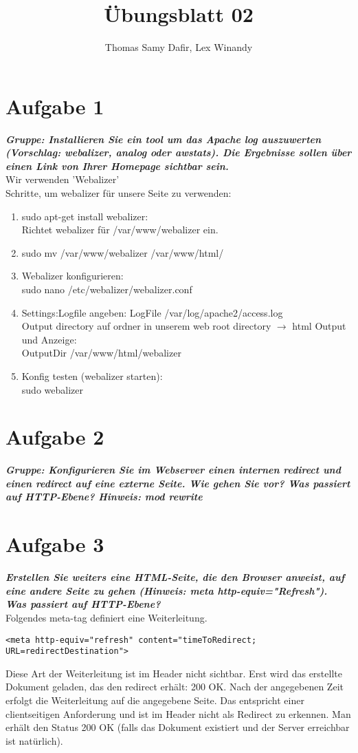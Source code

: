 \documentclass[12pt, a4paper]{report}
\title{Übungsblatt 02}
\author{Thomas Samy Dafir, Lex Winandy}
\date{}
\begin{document}
\maketitle

\section*{Aufgabe 1}
\textbf{\textit{Gruppe: Installieren Sie ein tool um das Apache log auszuwerten (Vorschlag: webalizer, analog oder awstats). Die Ergebnisse sollen über einen Link von Ihrer Homepage sichtbar sein.}}\\
Wir verwenden 'Webalizer'\\
Schritte, um webalizer für unsere Seite zu verwenden:\\
\begin{enumerate}
	\item sudo apt-get install webalizer:\\
	Richtet webalizer für /var/www/webalizer ein.
	\item sudo mv /var/www/webalizer /var/www/html/
	\item Webalizer konfigurieren:\\
	sudo nano /etc/webalizer/webalizer.conf
	\item Settings:Logfile angeben:
	LogFile /var/log/apache2/access.log\\
	Output directory auf ordner in unserem web root directory $\rightarrow$ html Output und Anzeige:\\
	OutputDir /var/www/html/webalizer
	\item Konfig testen (webalizer starten):\\
	sudo webalizer
\end{enumerate}


\section*{Aufgabe 2}
\textbf{\textit{Gruppe: Konfigurieren Sie im Webserver einen internen redirect und einen redirect auf eine externe Seite. Wie gehen Sie vor? Was passiert auf HTTP-Ebene? Hinweis: mod rewrite}}\\

\section*{Aufgabe 3}
\textbf{\textit{Erstellen Sie weiters eine HTML-Seite, die den Browser anweist, auf eine andere Seite zu gehen (Hinweis: meta http-equiv="Refresh"). Was passiert auf HTTP-Ebene?}}\\
Folgendes meta-tag definiert eine Weiterleitung.
\begin{verbatim}
<meta http-equiv="refresh" content="timeToRedirect; URL=redirectDestination">
\end{verbatim}
Diese Art der Weiterleitung ist im Header nicht sichtbar. Erst wird das erstellte Dokument geladen, das den redirect erhält: 200 OK. Nach der angegebenen Zeit
erfolgt die Weiterleitung auf die angegebene Seite. Das entspricht einer clientseitigen Anforderung und ist im Header nicht als Redirect zu erkennen. Man erhält
den Status 200 OK (falls das Dokument existiert und der Server erreichbar ist natürlich).
\end{document}
